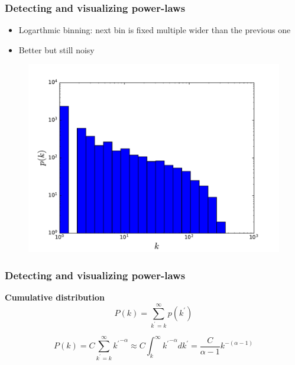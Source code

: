 \documentclass{beamer}
\begin{document}
\begin{frame}
    \frametitle{Detecting and visualizing power-laws}
    \centering
    \begin{itemize}
    \setlength\itemsep{1em}
        \item{Logarthmic binning: next bin is fixed multiple wider than the previous one}
        \item{Better but still noisy}
    \end{itemize}

\begin{figure}
    \begin{center}
        \includegraphics[width=0.8\columnwidth]{deg_distri_global_airport_log_logbins.pdf}
        \caption{\label{}}
    \end{center}
\end{figure}

\end{frame}
\begin{frame}
    \frametitle{Detecting and visualizing power-laws}
    \centering
    {\bf Cumulative distribution}
    $$P(k) = \sum\limits_{k^{\prime} = k}^\infty p(k^{\prime})$$

    $$P(k) = C\sum\limits_{k^{\prime} = k}^\infty {k^{\prime}}^{-\alpha} \approx C\int_k^\infty {k^{\prime}}^{-\alpha}dk^{\prime} = \frac{C}{\alpha-1}k^{-(\alpha-1)}$$
\end{frame}
\end{document}
